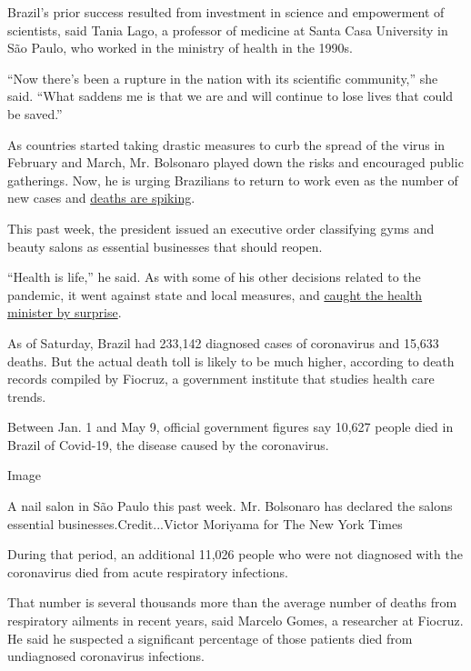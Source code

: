 Brazil's prior success resulted from investment in science and
empowerment of scientists, said Tania Lago, a professor of medicine at
Santa Casa University in São Paulo, who worked in the ministry of health
in the 1990s.

``Now there's been a rupture in the nation with its scientific
community,'' she said. ``What saddens me is that we are and will
continue to lose lives that could be saved.''

As countries started taking drastic measures to curb the spread of the
virus in February and March, Mr. Bolsonaro played down the risks and
encouraged public gatherings. Now, he is urging Brazilians to return to
work even as the number of new cases and
\href{https://www.nytimes3xbfgragh.onion/interactive/2020/world/americas/brazil-coronavirus-cases.html}{deaths
are spiking}.

This past week, the president issued an executive order classifying gyms
and beauty salons as essential businesses that should reopen.

``Health is life,'' he said. As with some of his other decisions related
to the pandemic, it went against state and local measures, and
\href{https://politica.estadao.com.br/noticias/geral,saude-e-vida-diz-bolsonaro-para-justificar-academia-em-servicos-essenciais,70003299552?utm_source=webpush_notificacao\&utm_medium=webpush_notificacao\&utm_campaign=webpush_notificacao}{caught
the health minister by surprise}.

As of Saturday, Brazil had 233,142 diagnosed cases of coronavirus and
15,633 deaths. But the actual death toll is likely to be much higher,
according to death records compiled by Fiocruz, a government institute
that studies health care trends.

Between Jan. 1 and May 9, official government figures say 10,627 people
died in Brazil of Covid-19, the disease caused by the coronavirus.

Image

A nail salon in São Paulo this past week. Mr. Bolsonaro has declared the
salons essential businesses.Credit...Victor Moriyama for The New York
Times

During that period, an additional 11,026 people who were not diagnosed
with the coronavirus died from acute respiratory infections.

That number is several thousands more than the average number of deaths
from respiratory ailments in recent years, said Marcelo Gomes, a
researcher at Fiocruz. He said he suspected a significant percentage of
those patients died from undiagnosed coronavirus infections.

